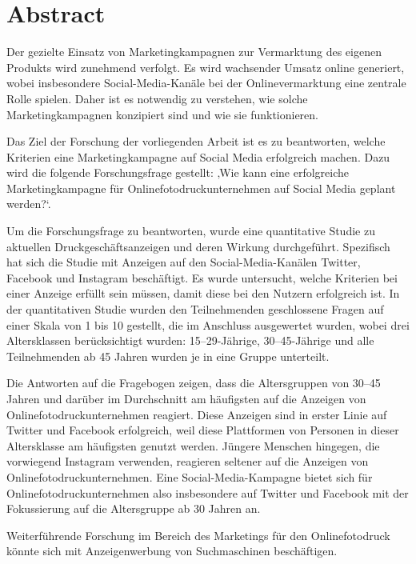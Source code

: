 \hypertarget{abstract}{%
\section{Abstract}\label{abstract}}

Der gezielte Einsatz von Marketingkampagnen zur Vermarktung des eigenen
Produkts wird zunehmend verfolgt. Es wird wachsender Umsatz online
generiert, wobei insbesondere Social-Media-Kanäle bei der
Onlinevermarktung eine zentrale Rolle spielen. Daher ist es notwendig zu
verstehen, wie solche Marketingkampagnen konzipiert sind und wie sie
funktionieren.

Das Ziel der Forschung der vorliegenden Arbeit ist es zu beantworten,
welche Kriterien eine Marketingkampagne auf Social Media erfolgreich
machen. Dazu wird die folgende Forschungsfrage gestellt: ‚Wie kann eine
erfolgreiche Marketingkampagne für Onlinefotodruckunternehmen auf Social
Media geplant werden?`.

Um die Forschungsfrage zu beantworten, wurde eine quantitative Studie zu
aktuellen Druckgeschäftsanzeigen und deren Wirkung durchgeführt.
Spezifisch hat sich die Studie mit Anzeigen auf den Social-Media-Kanälen
Twitter, Facebook und Instagram beschäftigt. Es wurde untersucht, welche
Kriterien bei einer Anzeige erfüllt sein müssen, damit diese bei den
Nutzern erfolgreich ist. In der quantitativen Studie wurden den
Teilnehmenden geschlossene Fragen auf einer Skala von 1 bis 10 gestellt,
die im Anschluss ausgewertet wurden, wobei drei Altersklassen
berücksichtigt wurden: 15--29-Jährige, 30--45-Jährige und alle
Teilnehmenden ab 45 Jahren wurden je in eine Gruppe unterteilt.

Die Antworten auf die Fragebogen zeigen, dass die Altersgruppen von
30--45 Jahren und darüber im Durchschnitt am häufigsten auf die Anzeigen
von Onlinefotodruckunternehmen reagiert. Diese Anzeigen sind in erster
Linie auf Twitter und Facebook erfolgreich, weil diese Plattformen von
Personen in dieser Altersklasse am häufigsten genutzt werden. Jüngere
Menschen hingegen, die vorwiegend Instagram verwenden, reagieren
seltener auf die Anzeigen von Onlinefotodruckunternehmen. Eine
Social-Media-Kampagne bietet sich für Onlinefotodruckunternehmen also
insbesondere auf Twitter und Facebook mit der Fokussierung auf die
Altersgruppe ab 30 Jahren an.

Weiterführende Forschung im Bereich des Marketings für den
Onlinefotodruck könnte sich mit Anzeigenwerbung von Suchmaschinen
beschäftigen.
